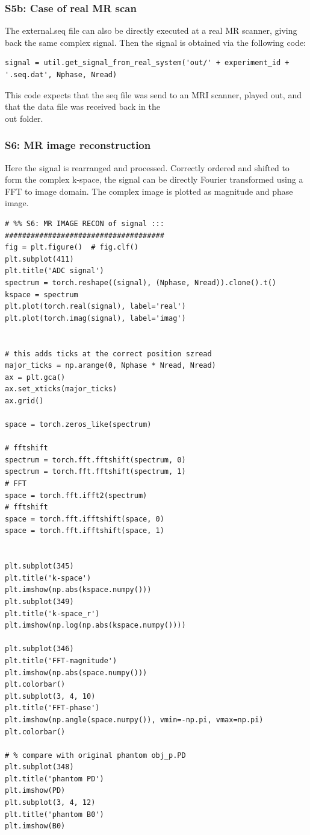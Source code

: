 \documentclass[a4paper,12pt]{extarticle}
\begin{document}
\subsubsection{S5b: Case of real MR scan}
The external.seq file can also be directly executed at a real MR scanner, giving back the same complex signal. Then the signal is obtained via the following code:

\begin{verbatim}
signal = util.get_signal_from_real_system('out/' + experiment_id + '.seq.dat', Nphase, Nread)
\end{verbatim}
This code expects that the seq file was send to an MRI scanner, played out, and that the data file was received back in the \\out folder.

\subsubsection{S6: MR image reconstruction}
Here the signal is rearranged and processed.
Correctly ordered and shifted to form the complex k-space, the signal can be directly Fourier transformed using a FFT to image domain.
The complex image is plotted as magnitude and phase image.

\begin{verbatim}
# %% S6: MR IMAGE RECON of signal ::: #####################################
fig = plt.figure()  # fig.clf()
plt.subplot(411)
plt.title('ADC signal')
spectrum = torch.reshape((signal), (Nphase, Nread)).clone().t()
kspace = spectrum
plt.plot(torch.real(signal), label='real')
plt.plot(torch.imag(signal), label='imag')


# this adds ticks at the correct position szread
major_ticks = np.arange(0, Nphase * Nread, Nread)
ax = plt.gca()
ax.set_xticks(major_ticks)
ax.grid()

space = torch.zeros_like(spectrum)

# fftshift
spectrum = torch.fft.fftshift(spectrum, 0)
spectrum = torch.fft.fftshift(spectrum, 1)
# FFT
space = torch.fft.ifft2(spectrum)
# fftshift
space = torch.fft.ifftshift(space, 0)
space = torch.fft.ifftshift(space, 1)


plt.subplot(345)
plt.title('k-space')
plt.imshow(np.abs(kspace.numpy()))
plt.subplot(349)
plt.title('k-space_r')
plt.imshow(np.log(np.abs(kspace.numpy())))

plt.subplot(346)
plt.title('FFT-magnitude')
plt.imshow(np.abs(space.numpy()))
plt.colorbar()
plt.subplot(3, 4, 10)
plt.title('FFT-phase')
plt.imshow(np.angle(space.numpy()), vmin=-np.pi, vmax=np.pi)
plt.colorbar()

# % compare with original phantom obj_p.PD
plt.subplot(348)
plt.title('phantom PD')
plt.imshow(PD)
plt.subplot(3, 4, 12)
plt.title('phantom B0')
plt.imshow(B0)


\end{verbatim}
\end{document}
